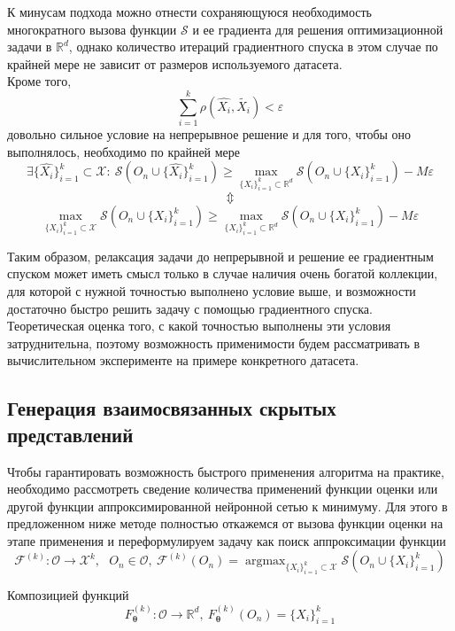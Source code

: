 \documentclass[a4paper,14pt]{extarticle}
\DeclareMathOperator*{\argmax}{argmax}
\begin{document}
			К минусам подхода можно отнести сохраняющуюся необходимость многократного вызова функции $\mathcal{S}$ и ее градиента для решения оптимизационной задачи в $\mathbb{R}^d$, однако количество итераций градиентного спуска в этом случае по крайней мере не зависит от размеров используемого датасета.\\
			Кроме того, 
			$$\sum_{i=1}^k\rho(\hat{X_i}, \tilde{X_i}) < \varepsilon$$
			довольно сильное условие на непрерывное решение и для того, чтобы оно выполнялось, необходимо по крайней мере
			$$\exists \{\hat{X_i}\}_{i=1}^k\subset\mathcal{X}:~ \mathcal{S}\left(O_n\cup\{\hat{X_i}\}_{i=1}^k\right) \geqslant \max_{\{X_i\}_{i=1}^k\subset\mathbb{R}^d} \mathcal{S}\left(O_n\cup\{X_i\}_{i=1}^k\right) - M\varepsilon$$
			$$\Updownarrow$$
			$$\max_{\{X_i\}_{i=1}^k\subset\mathcal{X}} \mathcal{S}\left(O_n\cup\{X_i\}_{i=1}^k\right) \geqslant \max_{\{X_i\}_{i=1}^k\subset\mathbb{R}^d} \mathcal{S}\left(O_n\cup\{X_i\}_{i=1}^k\right) - M\varepsilon$$
			
			Таким образом, релаксация задачи до непрерывной и решение ее градиентным спуском может иметь смысл только в случае наличия очень богатой коллекции, для которой с нужной точностью выполнено условие выше, и возможности достаточно быстро решить задачу с помощью градиентного спуска. Теоретическая оценка того, с какой точностью выполнены эти условия затруднительна, поэтому возможность применимости будем рассматривать в вычислительном эксперименте на примере конкретного датасета.
						
			\subsection{Генерация взаимосвязанных скрытых представлений}\label{generation}
			Чтобы гарантировать возможность быстрого применения алгоритма на практике, необходимо рассмотреть сведение количества применений функции оценки или другой функции аппроксимированной нейронной сетью к минимуму. Для этого в предложенном ниже методе полностью откажемся от вызова функции оценки на этапе применения и переформулируем задачу как поиск аппроксимации функции 
			$$\mathcal{F}^{(k)}: \mathcal{O}\longrightarrow \mathcal{X}^k, ~~~O_n\in \mathcal{O},~ \mathcal{F}^{(k)}(O_n) = \argmax_{\{X_i\}_{i=1}^k\subset\mathcal{X}} \mathcal{S}\left(O_n\cup\{X_i\}_{i=1}^k\right)$$
			
			Композицией функций 
			$$F^{(k)}_\mathbf{\theta}: \mathcal{O}\longrightarrow \mathbb{R}^d, ~F^{(k)}_\mathbf{\theta}(O_n) = \{X_i\}_{i=1}^k$$
			
\end{document}
